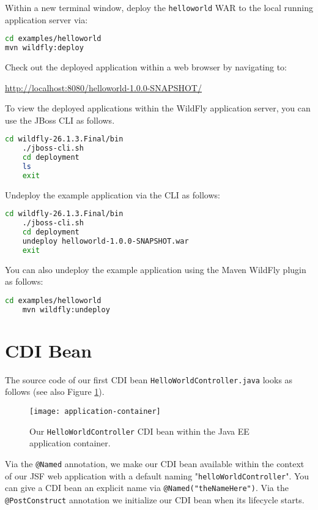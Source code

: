 Within a new terminal window, deploy the \texttt{helloworld} WAR to the local running application server via:
\begin{lstlisting}[language=bash]
cd examples/helloworld
mvn wildfly:deploy
\end{lstlisting}
Check out the deployed application within a web browser by navigating to:

\url{http://localhost:8080/helloworld-1.0.0-SNAPSHOT/}

To view the deployed applications within the WildFly application server, you can use the JBoss CLI as follows.
\begin{lstlisting}[language=bash]
	cd wildfly-26.1.3.Final/bin
	./jboss-cli.sh
	cd deployment
	ls
	exit
\end{lstlisting}

Undeploy the example application via the CLI as follows:
\begin{lstlisting}[language=bash]
	cd wildfly-26.1.3.Final/bin
	./jboss-cli.sh
	cd deployment
	undeploy helloworld-1.0.0-SNAPSHOT.war
	exit
\end{lstlisting}

You can also undeploy the example application using the Maven WildFly plugin as follows:
\begin{lstlisting}[language=bash]
	cd examples/helloworld
	mvn wildfly:undeploy
\end{lstlisting}


\section{CDI Bean}

The source code of our first CDI \cite{CDI2} bean \texttt{HelloWorldController.java} looks as follows (see also Figure \ref{fig:application-container}).
\begin{figure}[htbp]
	\begin{center}
		\texttt{[image: application-container]}
		\caption{Our \texttt{HelloWorldController} CDI bean within the Java EE application container.}
		\label{fig:application-container}
	\end{center}
\end{figure}

Via the \texttt{@Named} annotation, we make our CDI bean available within the context of our JSF web application with a default naming "\texttt{helloWorldController}".
You can give a CDI bean an explicit name via \texttt{@Named("theNameHere")}.
Via the \texttt{@PostConstruct} annotation we initialize our CDI bean when its lifecycle starts.

